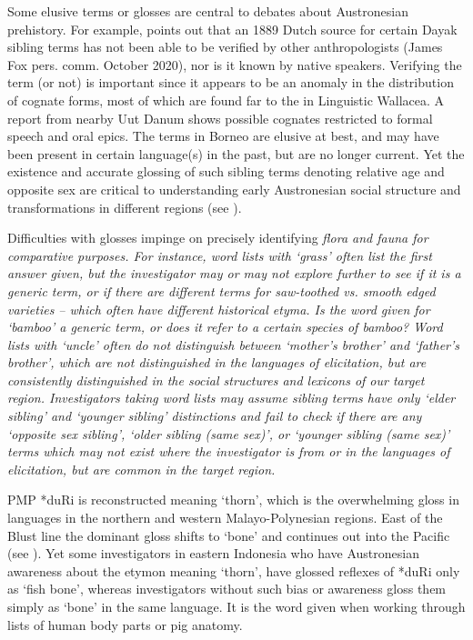 Some elusive terms or glosses are central to debates about Austronesian prehistory.
For example, \citet{Fox2011} points out that an 1889 Dutch source
for certain  Dayak sibling terms has not been able to be
verified by other anthropologists (James Fox pers. comm. October 2020),
nor is it known by native speakers.
Verifying the term (or not) is important since it appears to
be an anomaly in the distribution of cognate forms,
most of which are found far to the  in Linguistic Wallacea.
A report from nearby Uut Danum shows possible cognates restricted
to formal speech and oral epics.
The terms in Borneo are elusive at best,
and may have been present in certain language(s) in the past,
but are no longer current.
Yet the existence and accurate glossing of such sibling terms
denoting relative age and opposite sex are
critical to understanding early Austronesian
social structure and transformations
in different regions (see \citealp{Fox2015}).

Difficulties with glosses impinge on precisely identifying \it{flora
and fauna} for comparative purposes.
For instance, word lists with ‘grass’ often list the first answer
given, but the investigator may or may not explore further to see if
it is a generic term,
or if there are different terms for saw-toothed vs.
smooth edged varieties -- which often have different historical etyma.
Is the word given for ‘bamboo’ a generic term,
or does it refer to a certain species of bamboo? Word lists with
‘uncle’ often do not distinguish between ‘mother’s brother’
and ‘father’s brother’, which are not distinguished in the languages
of elicitation, but are consistently distinguished in the social structures
and lexicons of our target region.
Investigators taking word lists may assume sibling terms have
only ‘elder sibling’ and ‘younger sibling’ distinctions
and fail to check if there are any ‘opposite sex sibling’,
‘older sibling (same sex)’,
or ‘younger sibling (same sex)’ terms which may not exist where
the investigator is from or in the languages of elicitation,
but are common in the target region.

PMP *duRi is reconstructed meaning ‘thorn’,
which is the overwhelming gloss in languages in the northern
and western Malayo-Polynesian regions.
East of the Blust line the dominant gloss shifts to ‘bone’
and continues out into the Pacific (see ).
Yet some investigators in eastern Indonesia who have Austronesian
awareness about the etymon meaning ‘thorn’,
have glossed reflexes of *duRi only as ‘fish bone’,
whereas investigators without such bias or awareness gloss them
simply as ‘bone’ in the same language.
It is the word given when working through
lists of human body parts or pig anatomy.

